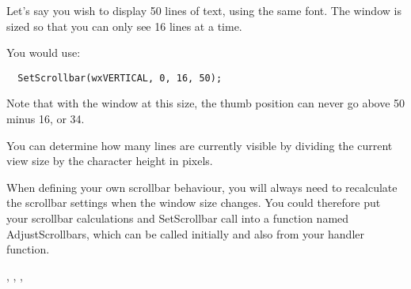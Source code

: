 

Let's say you wish to display 50 lines of text, using the same font.
The window is sized so that you can only see 16 lines at a time.

You would use:

{\small%
\begin{verbatim}
  SetScrollbar(wxVERTICAL, 0, 16, 50);
\end{verbatim}
}

Note that with the window at this size, the thumb position can never go
above 50 minus 16, or 34.

You can determine how many lines are currently visible by dividing the current view
size by the character height in pixels.

When defining your own scrollbar behaviour, you will always need to recalculate
the scrollbar settings when the window size changes. You could therefore put your
scrollbar calculations and SetScrollbar
call into a function named AdjustScrollbars, which can be called initially and also
from your  handler function.


,\rtfsp
{}, ,\rtfsp
{}

